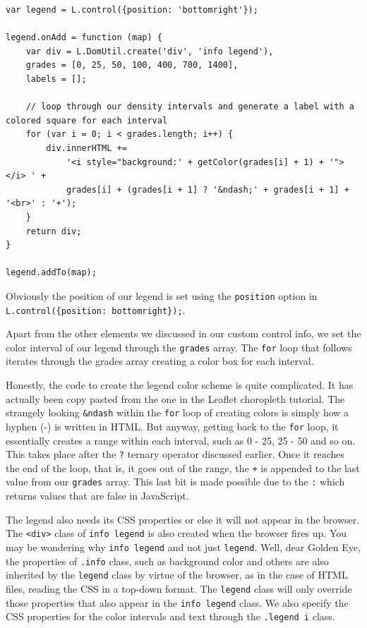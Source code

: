 \documentclass[
]{book}
\begin{document}
\begin{verbatim}
var legend = L.control({position: 'bottomright'});

legend.onAdd = function (map) {
    var div = L.DomUtil.create('div', 'info legend'),
    grades = [0, 25, 50, 100, 400, 700, 1400],
    labels = [];

    // loop through our density intervals and generate a label with a colored square for each interval
    for (var i = 0; i < grades.length; i++) {
        div.innerHTML += 
            '<i style="background:' + getColor(grades[i] + 1) + '"></i> ' + 
            grades[i] + (grades[i + 1] ? '&ndash;' + grades[i + 1] + '<br>' : '+');
    }
    return div;
}

legend.addTo(map);
\end{verbatim}

Obviously the position of our legend is set using the \texttt{position} option in \texttt{L.control(\{position:\ \textquotesingle{}bottomright\textquotesingle{}\});}.

Apart from the other elements we discussed in our custom control info, we set the color interval of our legend through the \texttt{grades} array. The \texttt{for} loop that follows iterates through the grades array creating a color box for each interval.

Honestly, the code to create the legend color scheme is quite complicated. It has actually been copy pasted from the one in the Leaflet choropleth tutorial. The strangely looking \texttt{\&ndash} within the \texttt{for} loop of creating colors is simply how a hyphen (-) is written in HTML. But anyway, getting back to the \texttt{for} loop, it essentially creates a range within each interval, such as 0 - 25, 25 - 50 and so on. This takes place after the \texttt{?} ternary operator discussed earlier. Once it reaches the end of the loop, that is, it goes out of the range, the \texttt{+} is appended to the last value from our \texttt{grades} array. This last bit is made possible due to the \texttt{:} which returns values that are false in JavaScript.

The legend also needs its CSS properties or else it will not appear in the browser. The \texttt{\textless{}div\textgreater{}} class of \texttt{info\ legend} is also created when the browser fires up. You may be wondering why \texttt{info\ legend} and not just \texttt{legend}. Well, dear Golden Eye, the properties of \texttt{.info} class, such as background color and others are also inherited by the \texttt{legend} class by virtue of the browser, as in the case of HTML files, reading the CSS in a top-down format. The \texttt{legend} class will only override those properties that also appear in the \texttt{info\ legend} class. We also specify the CSS properties for the color intervals and text through the \texttt{.legend\ i} class.
\end{document}

